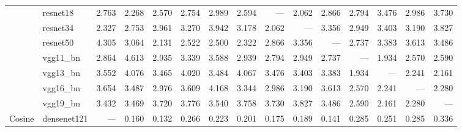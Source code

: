 \begin{table}
\begin{tabular}{llrrrrrrrrrrrrr}
       & resnet18 &                 2.763 &                 2.268 &                 2.570 &               2.754 &                   2.989 &                   2.594 &                --- &              2.062 &              2.866 &               2.794 &               3.476 &               2.986 &               3.730 \\
       & resnet34 &                 2.327 &                 2.753 &                 2.961 &               3.270 &                   3.942 &                   3.178 &              2.062 &                --- &              3.356 &               2.949 &               3.403 &               3.190 &               3.827 \\
       & resnet50 &                 4.305 &                 3.064 &                 2.131 &               2.522 &                   2.500 &                   2.322 &              2.866 &              3.356 &                --- &               2.737 &               3.383 &               3.613 &               3.486 \\
       & vgg11_bn &                 2.864 &                 4.613 &                 2.935 &               3.339 &                   3.588 &                   2.939 &              2.794 &              2.949 &              2.737 &                 --- &               1.934 &               2.570 &               2.590 \\
       & vgg13_bn &                 3.552 &                 4.076 &                 3.465 &               4.020 &                   3.484 &                   4.067 &              3.476 &              3.403 &              3.383 &               1.934 &                 --- &               2.241 &               2.161 \\
       & vgg16_bn &                 3.654 &                 3.487 &                 2.976 &               3.609 &                   4.168 &                   3.344 &              2.986 &              3.190 &              3.613 &               2.570 &               2.241 &                 --- &               2.280 \\
       & vgg19_bn &                 3.432 &                 3.469 &                 3.720 &               3.776 &                   3.540 &                   3.758 &              3.730 &              3.827 &              3.486 &               2.590 &               2.161 &               2.280 &                 --- \\
\cline{1-15}
\multirow{13}{*}{Cosine} & densenet121 &                   --- &                 0.160 &                 0.132 &               0.266 &                   0.223 &                   0.201 &              0.175 &              0.189 &              0.141 &               0.285 &               0.251 &               0.285 &               0.336 \\

\end{tabular}
\end{table}
